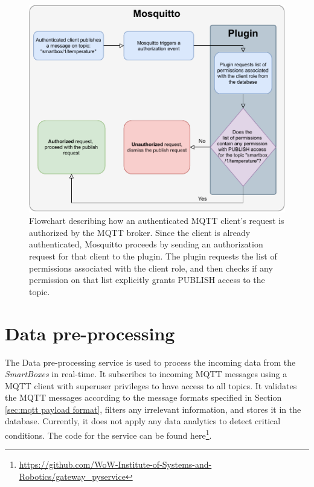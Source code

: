 \begin{figure}[H]
    \centering
    \includegraphics[width=\linewidth]{images/mqtt authorization.pdf}
    \caption[Flowchart describing how a PUBLISH request from an authenticated \acs{MQTT} client is authorized by the \acs{MQTT} broker.]{Flowchart describing how an authenticated \acs{MQTT} client's request is authorized by the \acs{MQTT} broker. Since the client is already authenticated, Mosquitto proceeds by sending an authorization request for that client to the plugin. The plugin requests the list of permissions associated with the client role, and then checks if any permission on that list explicitly grants PUBLISH access to the topic.}
    \label{fig:mqtt-plugin-authzflow}
\end{figure}
\section{Data pre-processing}

The Data pre-processing service is used to process the incoming data from the \textit{SmartBoxes} in real-time. It subscribes to incoming \acs{MQTT} messages using a \acs{MQTT} client with superuser privileges to have access to all topics. It validates the \acs{MQTT} messages according to the message formats specified in Section \ref{sec:mqtt payload format}, filters any irrelevant information, and stores it in the database. Currently, it does not apply any data analytics to detect critical conditions. The code for the service can be found here\footnote{\url{https://github.com/WoW-Institute-of-Systems-and-Robotics/gateway_pyservice}}. 

